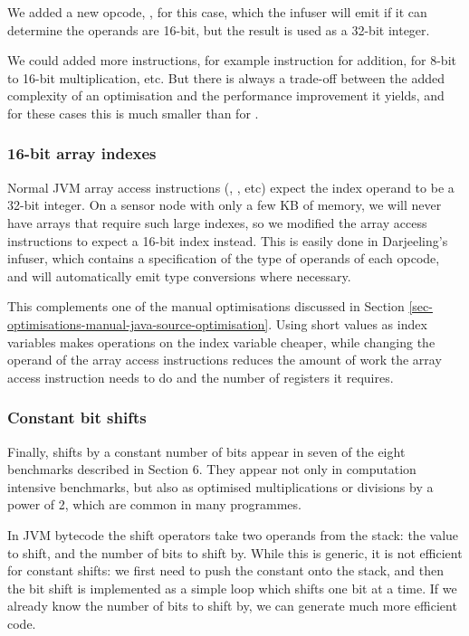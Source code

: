We added a new opcode, , for this case, which the infuser will emit if it can determine the operands are 16-bit, but the result is used as a 32-bit integer.

We could added more instructions, for example  instruction for addition,  for 8-bit to 16-bit multiplication, etc. But there is always a trade-off between the added complexity of an optimisation and the performance improvement it yields, and for these cases this is much smaller than for .

\subsubsection{16-bit array indexes}
Normal JVM array access instructions (, , etc) expect the index operand to be a 32-bit integer. On a sensor node with only a few KB of memory, we will never have arrays that require such large indexes, so we modified the array access instructions to expect a 16-bit index instead. This is easily done in Darjeeling's infuser, which contains a specification of the type of operands of each opcode, and will automatically emit type conversions where necessary.

This complements one of the manual optimisations discussed in Section \ref{sec-optimisations-manual-java-source-optimisation}. Using short values as index variables makes operations on the index variable cheaper, while changing the operand of the array access instructions reduces the amount of work the array access instruction needs to do and the number of registers it requires.

\subsubsection{Constant bit shifts}
\label{sec-opt-constant-shift}
Finally, shifts by a constant number of bits appear in seven of the eight benchmarks described in Section 6. They appear not only in computation intensive benchmarks, but also as optimised multiplications or divisions by a power of 2, which are common in many programmes.

In JVM bytecode the shift operators take two operands from the stack: the value to shift, and the number of bits to shift by. While this is generic, it is not efficient for constant shifts: we first need to push the constant onto the stack, and then the bit shift is implemented as a simple loop which shifts one bit at a time. If we already know the number of bits to shift by, we can generate much more efficient code.

